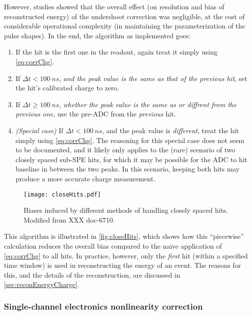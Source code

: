 \documentclass[../thesis.tex]{subfiles}
\begin{document}
However, studies showed that the overall effect (on resolution and bias of reconstructed energy) of the undershoot correction was negligible, at the cost of considerable operational complexity (in maintaining the parameterization of the pulse shapes). In the end, the algorithm as implemented goes:

\begin{enumerate}
\item If the hit is the first one in the readout, again treat it simply using \eqref{eq:corrChg}.
\item If $\Delta t < \SI{100}{ns}$, \emph{and the peak value is the same as that of the previous hit}, set the hit's calibrated charge to zero.
\item If $\Delta t \ge \SI{100}{ns}$, \emph{whether the peak value is the same as or diffrent from the previous one}, use the pre-ADC from the \emph{previous} hit.
\item \emph{(Special case)} If $\Delta t < \SI{100}{ns}$, and the peak value is \emph{different}, treat the hit simply using \eqref{eq:corrChg}. The reasoning for this special case does not seem to be documented, and it likely only applies to the (rare) scenario of two closely spaced sub-SPE hits, for which it may be possible for the ADC to hit baseline in between the two peaks. In this scenario, keeping both hits may produce a more accurate charge measurement.
\end{enumerate}

\begin{figure}[ht]
  \texttt{[image: closeHits.pdf]}
  \caption{Biases induced by different methods of handling closely spaced hits. Modified from XXX doc-6710.}
  \label{fig:closeHits}
\end{figure}

This algorithm is illustrated in \autoref{fig:closeHits}, which shows how this ``piecewise'' calculation reduces the overall bias compared to the naive application of \eqref{eq:corrChg} to all hits. In practice, however, only the \emph{first} hit (within a specified time window) is used in reconstructing the energy of an event. The reasons for this, and the details of the reconstruction, are discussed in \autoref{sec:reconEnergyCharge}.

\subsubsection{Single-channel electronics nonlinearity correction}
\label{sec:calibSCNL}
\end{document}
